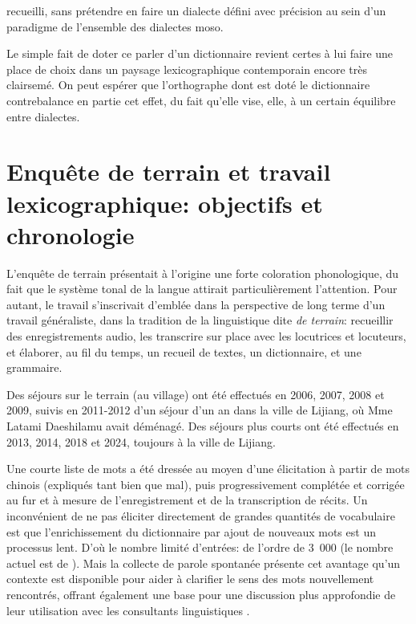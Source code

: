 recueilli, sans prétendre en faire un dialecte défini avec précision au sein d'un paradigme de l'ensemble des dialectes moso.

Le simple fait de doter ce parler d'un dictionnaire revient certes à lui faire une place de choix dans un paysage lexicographique contemporain encore très clairsemé. On peut espérer que l'orthographe dont est doté le dictionnaire contrebalance en partie cet effet, du fait qu'elle vise, elle, à un certain équilibre entre dialectes.



\section{Enquête de terrain et travail lexicographique: objectifs et chronologie}
\label{sec:chronologie}


L'enquête de terrain présentait à l'origine une forte coloration phonologique, du fait que le système tonal de la langue attirait particulièrement l'attention. Pour autant, le travail s'inscrivait d'emblée dans la perspective de long terme d'un travail généraliste, dans la tradition de la linguistique dite \emph{de terrain}: recueillir des enregistrements audio, les transcrire sur place avec les locutrices et locuteurs, et élaborer, au fil du temps, un recueil de textes, un dictionnaire, et une grammaire.

Des séjours sur le terrain (au village) ont été effectués en 2006, 2007, 2008 et 2009, suivis en 2011-2012 d'un séjour d'un an dans la ville de Lijiang, où Mme Latami Daeshilamu avait déménagé. Des séjours plus courts ont été effectués en 2013, 2014, 2018 et 2024, toujours à la ville de Lijiang.

Une courte liste de mots a été dressée au moyen d'une élicitation à partir de mots chinois (expliqués tant bien que mal), puis progressivement complétée et corrigée au fur et à mesure de l'enregistrement et de la transcription de récits. Un inconvénient de ne pas éliciter directement de grandes quantités de vocabulaire est que l'enrichissement du dictionnaire par ajout de nouveaux mots est un processus lent. D'où le nombre limité d'entrées: de l'ordre de 3~000 (le nombre actuel est de ). Mais la collecte de parole spontanée présente cet avantage qu'un contexte est disponible pour aider à clarifier le sens des mots nouvellement rencontrés, offrant également une base pour une discussion plus approfondie de leur utilisation avec les consultants linguistiques \parencite[44]{mosel_dictionary_2004}.

